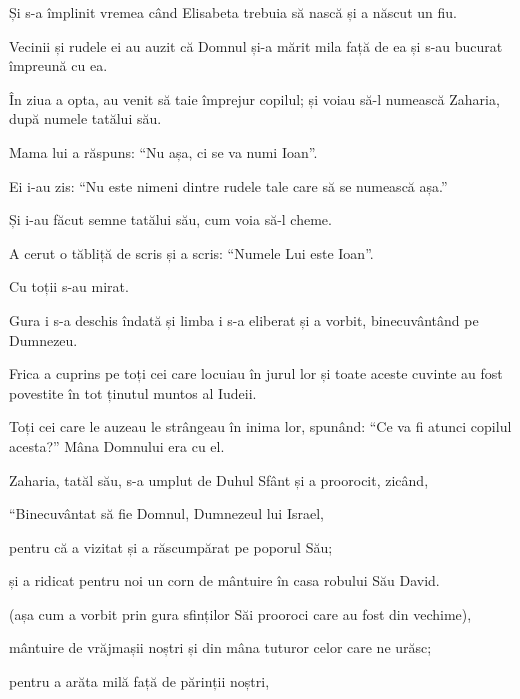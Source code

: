 {\par }{\PP {}Și s-a împlinit vremea când Elisabeta trebuia să nască și a născut un fiu.

Vecinii și rudele ei au auzit că Domnul și-a mărit mila față de ea și s-au bucurat împreună cu ea.

În ziua a opta, au venit să taie împrejur copilul; și voiau să-l numească Zaharia, după numele tatălui său.

Mama lui a răspuns: “Nu așa, ci se va numi Ioan”.


\par }{\PP {}Ei i-au zis: “Nu este nimeni dintre rudele tale care să se numească așa.”

Și i-au făcut semne tatălui său, cum voia să-l cheme.


\par }{\PP {}A cerut o tăbliță de scris și a scris: “Numele Lui este Ioan”.

\par }{\PP Cu toții s-au mirat.

Gura i s-a deschis îndată și limba i s-a eliberat și a vorbit, binecuvântând pe Dumnezeu.

Frica a cuprins pe toți cei care locuiau în jurul lor și toate aceste cuvinte au fost povestite în tot ținutul muntos al Iudeii.

Toți cei care le auzeau le strângeau în inima lor, spunând: “Ce va fi atunci copilul acesta?” Mâna Domnului era cu el.


\par }{\PP {}Zaharia, tatăl său, s-a umplut de Duhul Sfânt și a proorocit, zicând,


\par }{\Q {}“Binecuvântat să fie Domnul, Dumnezeul lui Israel,

\par }{\QB pentru că a vizitat și a răscumpărat pe poporul Său;


\par }{\Q {}și a ridicat pentru noi un corn de mântuire în casa robului Său David.


\par }{\QB {}(așa cum a vorbit prin gura sfinților Săi prooroci care au fost din vechime),


\par }{\QB {}mântuire de vrăjmașii noștri și din mâna tuturor celor care ne urăsc;


\par }{\Q {}pentru a arăta milă față de părinții noștri,

}
